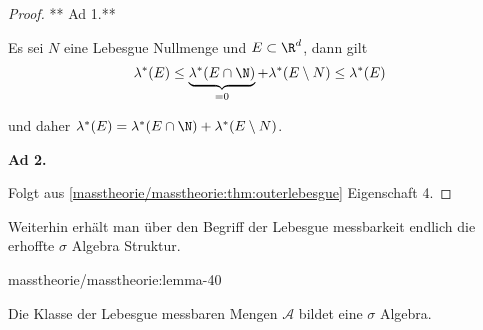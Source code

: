 \documentclass[letterpaper,10pt,german]{jupyterBook}
\begin{document}
\begin{proof}
 ** Ad 1.**

\par
Es sei \(N\) eine Lebesgue Nullmenge und \(E\subset\R^d\), dann gilt
\begin{align*}
\lambda^\ast(E) \leq \underbrace{\lambda^\ast(E\cap\N)}_{=0} + \lambda^\ast(E\setminus N)\leq
 \lambda^\ast(E)
\end{align*}
\par
und daher \(\lambda^\ast(E) = \lambda^\ast(E\cap\N) + \lambda^\ast(E\setminus N)\).

\par
\textbf{Ad 2.}

\par
Folgt aus \cref{masstheorie/masstheorie:thm:outerlebesgue} Eigenschaft 4.
\end{proof}

\par
Weiterhin erhält man über den Begriff der Lebesgue messbarkeit endlich die erhoffte \(\sigma\) Algebra Struktur.
\begin{lemma}{}{masstheorie/masstheorie:lemma-40}



\par
Die Klasse der Lebesgue messbaren Mengen \(\mathcal{A}\) bildet eine \(\sigma\) Algebra.
\end{lemma}
\end{document}
